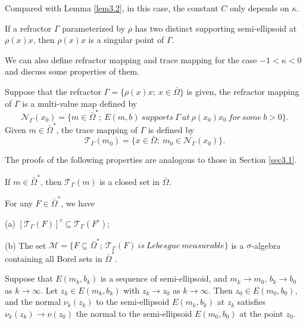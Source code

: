 \documentclass[a4paper,12pt,]{article}
\newtheorem{lemma}{\hskip\parindent\bf Lemma}[section]%
\newtheorem{remark}{\hskip\parindent\bf Remark}[section]%
\newtheorem{definition}{\hskip\parindent\bf Definition}[section]%
\numberwithin{equation}{section}
\numberwithin{equation}{section} \allowdisplaybreaks
\begin{document}
\begin{remark}
  Compared with Lemma \ref{lem3.2}, in this case, the constant $C$ only depends on $\kappa$.
  \label{rem4.1}
\end{remark}

\begin{remark}
  If a refractor $\Gamma$ parameterized by $\rho$ has two distinct supporting semi-ellipsoid at $\rho(x)x$, then $\rho(x)x$ is a singular point of $\Gamma$.
  \label{rem4.2}
\end{remark}


We can also define refractor mapping and trace mapping for the case $-1 < \kappa <0$ and discuss some properties of them.

\begin{definition}
  Suppose that the refractor $\Gamma = \{\rho(x)x;~x \in \bar{\Omega}\}$ is given, the refractor mapping of $\Gamma$ is a multi-value map defined by
  \begin{equation}\label{4.1}
    \mathcal{N}_{\Gamma}(x_{0}) = \{m \in \bar{\Omega}^{\ast};~E(m,b) ~supports~\Gamma ~at ~\rho(x_{0})x_{0} ~ for ~ some ~ b>0 \}.
  \end{equation}
  Given $m \in \bar{\Omega}^{\ast}$, the trace mapping of $\Gamma$ is defined by
  \begin{equation}\label{4.2}
    \mathcal{T}_{\Gamma}(m_{0}) = \{x \in \bar{\Omega};~m_{0}\in \mathcal{N}_{\Gamma}(x_{0})\}.
  \end{equation}
  \label{def4.2}
\end{definition}

The proofs of the following properties are analogous to those in Section  \ref{sec3.1}.

\begin{lemma}
  If $m \in \bar{\Omega}^{\ast}$, then $\mathcal{T}_{\Gamma}(m)$ is a closed set in $\bar{\Omega}$.
  \label{lem4.3}
\end{lemma}

\begin{lemma}
  For any $F \in \bar{\Omega}^{\ast}$, we have
  
   (a) $[\mathcal{T}_{\Gamma}(F)]^{c} \subseteq \mathcal{T}_{\Gamma}(F^{c})$;
   
   (b) The set $\mathcal{M} = \{F \subseteq \bar{\Omega}^{\ast};~\mathcal{T}_{\Gamma}(F)~is~Lebesgue~measurable\}$ is a $\sigma$-algebra containing all Borel sets in $\bar{\Omega}^{\ast}$.
  \label{lem4.4}
\end{lemma}

\begin{lemma}
  Suppose that $E(m_{k},b_{k})$ is a sequence of semi-ellipsoid, and $m_{k}\rightarrow m_{0}$, $b_{k}\rightarrow b_{0}$ as $k\rightarrow \infty$. Let $z_{k} \in E(m_{k},b_{k})$ with $z_{k} \rightarrow z_{0}$ as $k\rightarrow \infty$. Then $z_{0} \in E(m_{0},b_{0})$, and the normal $\nu_{k}(z_{k})$ to the semi-ellipsoid $E(m_{k},b_{k})$ at $z_{k}$ satisfies $\nu_{k}(z_{k}) \rightarrow \nu(z_{0})$ the normal to the semi-ellipsoid $E(m_{0},b_{0})$ at the point $z_{0}$.
  \label{lem4.5}
\end{lemma}
\end{document}
